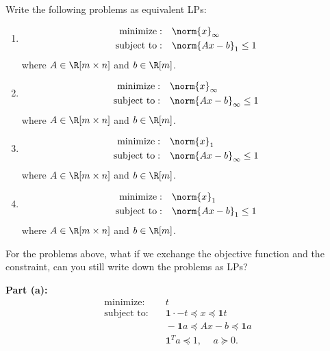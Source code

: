 \documentclass[11pt]{article}
\DeclareMathOperator{\minimize}{minimize:}
\DeclareMathOperator{\subjectto}{subject\ to:}
\begin{document}
\pagebreak

\begin{homeworkProblem}
    Write the following problems as equivalent LPs:
    \begin{enumerate}[label=(\alph*), topsep=5pt, itemsep=5pt]
        \item \begin{align*}
                  \minimize  & \quad \norm{x}_\infty        \\
                  \subjectto & \quad \norm{Ax - b}_1 \leq 1
              \end{align*} where $A \in \R[m \times n]$ and $b \in \R[m]$.
        \item \begin{align*}
                  \minimize  & \quad \norm{x}_\infty             \\
                  \subjectto & \quad \norm{Ax - b}_\infty \leq 1
              \end{align*} where $A \in \R[m \times n]$ and $b \in \R[m]$.
        \item \begin{align*}
                  \minimize  & \quad \norm{x}_1                  \\
                  \subjectto & \quad \norm{Ax - b}_\infty \leq 1
              \end{align*} where $A \in \R[m \times n]$ and $b \in \R[m]$.
        \item \begin{align*}
                  \minimize  & \quad \norm{x}_1             \\
                  \subjectto & \quad \norm{Ax - b}_1 \leq 1
              \end{align*} where $A \in \R[m \times n]$ and $b \in \R[m]$.
    \end{enumerate}
    For the problems above, what if we exchange the objective function and the constraint, can you still write down the problems as LPs? \\

    \solution

    \textbf{Part (a):}
    \begin{align*}
        \minimize  & \quad t                                                  \\
        \subjectto & \quad \mathbf{1} \cdot -t  \preceq x \preceq \mathbf{1}t \\
                   & \quad -\mathbf{1}a \preceq Ax - b \preceq \mathbf{1}a    \\
                   & \quad \mathbf{1}^T a \preceq 1, \, \quad a \succeq 0.
    \end{align*}


\end{homeworkProblem}
\end{document}
